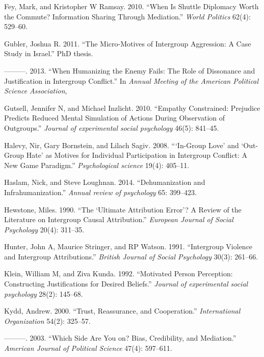 \documentclass[11pt]{article}
\begin{document}
\hypertarget{ref-fey2010shuttle}{}
Fey, Mark, and Kristopher W Ramsay. 2010. ``When Is Shuttle Diplomacy
Worth the Commute? Information Sharing Through Mediation.'' \emph{World
Politics} 62(4): 529--60.

\hypertarget{ref-gubler2011diss}{}
Gubler, Joshua R. 2011. ``The Micro-Motives of Intergroup Aggression: A
Case Study in Israel.'' PhD thesis.

\hypertarget{ref-gubler2013humanizing}{}
---------. 2013. ``When Humanizing the Enemy Fails: The Role of
Dissonance and Justification in Intergroup Conflict.'' In \emph{Annual
Meeting of the American Political Science Association},

\hypertarget{ref-gutsell2010empathy}{}
Gutsell, Jennifer N, and Michael Inzlicht. 2010. ``Empathy Constrained:
Prejudice Predicts Reduced Mental Simulation of Actions During
Observation of Outgroups.'' \emph{Journal of experimental social
psychology} 46(5): 841--45.

\hypertarget{ref-halevy2008group}{}
Halevy, Nir, Gary Bornstein, and Lilach Sagiv. 2008. ```In-Group Love'
and `Out-Group Hate' as Motives for Individual Participation in
Intergroup Conflict: A New Game Paradigm.'' \emph{Psychological science}
19(4): 405--11.

\hypertarget{ref-haslam2014dehumanization}{}
Haslam, Nick, and Steve Loughnan. 2014. ``Dehumanization and
Infrahumanization.'' \emph{Annual review of psychology} 65: 399--423.

\hypertarget{ref-hewstone1990ultimate}{}
Hewstone, Miles. 1990. ``The `Ultimate Attribution Error'? A Review of
the Literature on Intergroup Causal Attribution.'' \emph{European
Journal of Social Psychology} 20(4): 311--35.

\hypertarget{ref-hunter1991intergroup}{}
Hunter, John A, Maurice Stringer, and RP Watson. 1991. ``Intergroup
Violence and Intergroup Attributions.'' \emph{British Journal of Social
Psychology} 30(3): 261--66.

\hypertarget{ref-klein1992motivated}{}
Klein, William M, and Ziva Kunda. 1992. ``Motivated Person Perception:
Constructing Justifications for Desired Beliefs.'' \emph{Journal of
experimental social psychology} 28(2): 145--68.

\hypertarget{ref-kydd2000trust}{}
Kydd, Andrew. 2000. ``Trust, Reassurance, and Cooperation.''
\emph{International Organization} 54(2): 325--57.

\hypertarget{ref-kydd2003side}{}
---------. 2003. ``Which Side Are You on? Bias, Credibility, and
Mediation.'' \emph{American Journal of Political Science} 47(4):
597--611.
\end{document}
